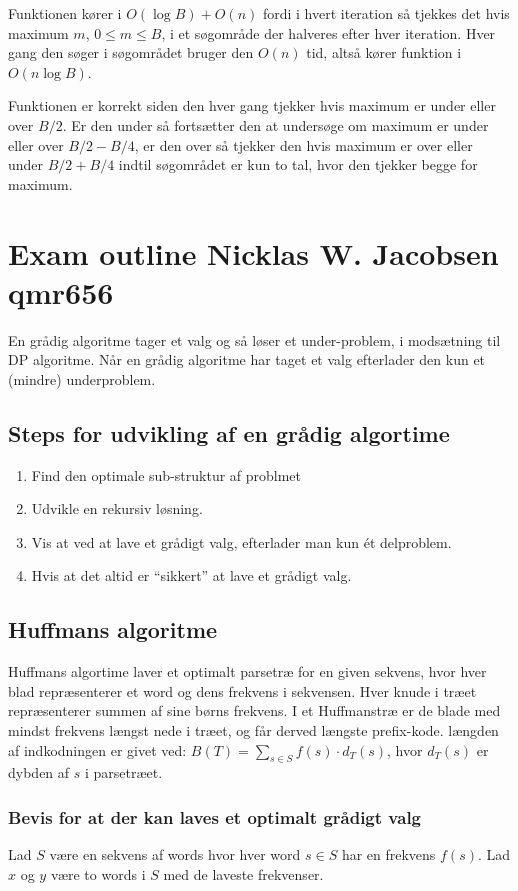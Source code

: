 \documentclass[12pt]{article}
\begin{document}
Funktionen kører i $O(\log{B}) + O(n)$ fordi i hvert iteration så tjekkes det hvis maximum $m$, $0 \leq m \leq B$, i et søgområde der halveres efter hver iteration. Hver gang den søger i søgområdet bruger den $O(n)$ tid, altså kører funktion i $O(n\log B)$.

Funktionen er korrekt siden den hver gang tjekker hvis maximum er under eller over $B/2$. Er den under så fortsætter den at undersøge om maximum er under eller over $B/2-B/4$, er den over så tjekker den hvis maximum er over eller under $B/2+B/4$ indtil søgområdet er kun to tal, hvor den tjekker begge for maximum.

\section*{Exam outline Nicklas W. Jacobsen qmr656}
En grådig algoritme tager et valg og så løser et under-problem, i modsætning til DP algoritme. Når en grådig algoritme har taget et valg efterlader den kun et (mindre) underproblem.
\subsection*{Steps for udvikling af en grådig algortime}
\begin{enumerate}
  \item{Find den optimale sub-struktur af problmet}
  \item{Udvikle en rekursiv løsning.}
  \item{Vis at ved at lave et grådigt valg, efterlader man kun ét delproblem.}
  \item{Hvis at det altid er ``sikkert'' at lave et grådigt valg.}
\end{enumerate}
\subsection*{Huffmans algoritme}
Huffmans algortime laver et optimalt parsetræ for en given sekvens, hvor hver blad repræsenterer et word og dens frekvens i sekvensen. Hver knude i træet repræsenterer summen af sine børns frekvens.
I et Huffmanstræ er de blade med mindst frekvens længst nede i træet, og får derved længste prefix-kode.
længden af indkodningen er givet ved: $B(T)=\sum\limits_{s\in S}f(s)\cdot d_T(s)$, hvor $d_T(s)$ er dybden af $s$ i parsetræet.
\subsubsection*{Bevis for at der kan laves et optimalt grådigt valg}
Lad $S$ være en sekvens af words hvor hver word $s \in S$ har en frekvens $f(s)$. Lad $x$ og $y$ være to words i $S$ med de laveste frekvenser.
\end{document}
